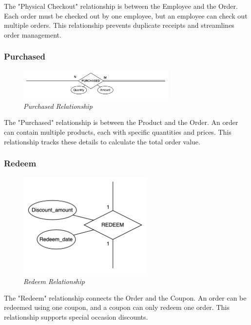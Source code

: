 \documentclass[11pt]{article}
\begin{document}
The "Physical Checkout" relationship is between the Employee and the Order. Each order must be checked out by one employee, but an employee can check out multiple orders. This relationship prevents duplicate receipts and streamlines order management.

\subsubsection{Purchased}
\begin{figure}[H]
  \centering
  \includegraphics[width=0.7\textwidth]{images/relationships/purchased.png}
  \caption{\textit{Purchased Relationship}}
\end{figure}

The "Purchased" relationship is between the Product and the Order. An order can contain multiple products, each with specific quantities and prices. This relationship tracks these details to calculate the total order value.

\subsubsection{Redeem}
\begin{figure}[H]
  \centering
  \includegraphics[width=0.6\textwidth]{images/relationships/redeem.png}
  \caption{\textit{Redeem Relationship}}
\end{figure}

The "Redeem" relationship connects the Order and the Coupon. An order can be redeemed using one coupon, and a coupon can only redeem one order. This relationship supports special occasion discounts.
\end{document}
